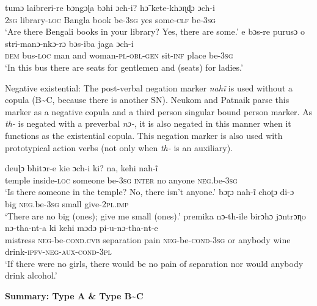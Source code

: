 \documentclass[output=paper]{langsci/langscibook}
\begin{document}
\begin{unindented}
\begin{exe}
\ex \gll tumɔ laibreri-re bɔngɔɭa bɔhi  ɔch-i? hɔ̃ kete-khɔɳɖɔ ɔch-i \\
\textsc{2sg} library-\textsc{loc} Bangla book be-\textsc{3sg} yes some-\textsc{clf} be-\textsc{3sg} \\
    \glt `Are there Bengali books in your library? Yes, there are some.'
\parencite[118]{NeukomPatnaik2003}
\ex \gll e bɔs-re purusɔ o stri-manɔ-nkɔ-rɔ bɔs-iba jaga  ɔch-i \\
\textsc{dem} bus-\textsc{loc} man and woman-\textsc{pl-obl-gen} sit-\textsc{inf} place be-\textsc{3sg} \\
\glt `In this bus there are seats for gentlemen and (seats) for ladies.'
\parencite[38]{NeukomPatnaik2003}
    \end{exe}

Negative existential: The post-verbal negation marker \textit{nahĩ} is used without a copula (B{\textasciitilde}C, because there is another SN). Neukom and Patnaik parse this marker as a negative copula and a third person singular bound person marker. As \textit{th-} is negated with a preverbal \textit{nɔ-}, it is also negated in this manner when it functions as the existential copula. This negation marker is also used with prototypical action verbs (not only when \textit{th-} is an auxiliary). 
%
\begin{exe}\ex \gll deuɭɔ bhitɔr-e kie ɔch-i ki? na, kehi nah-ĩ \\
temple inside-\textsc{loc}   someone be-\textsc{3sg}   \textsc{inter}      no  anyone \textsc{neg}.be-\textsc{3sg} \\
    \glt `Is there someone in the temple? No, there isn't anyone.'
\parencite[100]{NeukomPatnaik2003}
\ex \gll bɔɽɔ nah-ĩ choʈɔ di-ɔ \\
big \textsc{neg}.be-\textsc{3sg} small give-\textsc{2pl.imp} \\
    \glt `There are no big (ones); give me small (ones).' \parencite[72]{NeukomPatnaik2003} 
\ex \gll premika nɔ-th-ile birɔhɔ jɔntrɔɳo nɔ-tha-nt-a ki kehi mɔdɔ pi-u-nɔ-tha-nt-e \\
mistress \textsc{neg}-be-\textsc{cond}.\textsc{cvb}   separation pain        \textsc{neg}-be-\textsc{cond}-\textsc{3sg} or anybody wine drink-\textsc{ipfv-neg-aux-cond-3pl} \\
    \glt `If there were no girls, there would be no pain of separation nor
would anybody drink alcohol.' \parencite[195]{NeukomPatnaik2003}
\end{exe}

\textbf{Summary: Type A \& Type B{\textasciitilde}C} 


\end{unindented}
\end{document}
